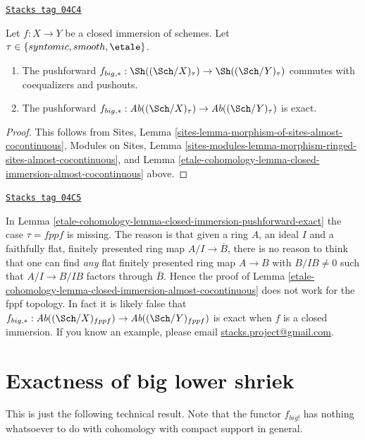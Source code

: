 \begin{lemma}
\label{etale-cohomology-lemma-closed-immersion-pushforward-exact}
\href{https://stacks.math.columbia.edu/tag/04C4}{\texttt{Stacks tag 04C4}}

Let $f : X \to Y$ be a closed immersion of schemes.
Let $\tau \in \{syntomic, smooth, \etale\}$.
\begin{enumerate}
\item The pushforward
$f_{big, *} :
\Sh((\Sch/X)_\tau)
\to
\Sh((\Sch/Y)_\tau)$
commutes with coequalizers and pushouts.
\item The pushforward
$f_{big, *} :
\textit{Ab}((\Sch/X)_\tau)
\to
\textit{Ab}((\Sch/Y)_\tau)$
is exact.
\end{enumerate}
\end{lemma}

\begin{proof}
This follows from
Sites, Lemma \ref{sites-lemma-morphism-of-sites-almost-cocontinuous},
Modules on Sites,
Lemma \ref{sites-modules-lemma-morphism-ringed-sites-almost-cocontinuous},
and
Lemma \ref{etale-cohomology-lemma-closed-immersion-almost-cocontinuous}
above.
\end{proof}

\begin{remark}
\label{etale-cohomology-remark-fppf-closed-immersion-not-closed}
\href{https://stacks.math.columbia.edu/tag/04C5}{\texttt{Stacks tag 04C5}}

In Lemma \ref{etale-cohomology-lemma-closed-immersion-pushforward-exact} the case $\tau = fppf$
is missing. The reason is that given a ring $A$, an ideal $I$ and a
faithfully flat, finitely presented ring map $A/I \to \overline{B}$, there
is no reason to think that one can find {\it any} flat finitely presented ring
map $A \to B$ with $B/IB \not = 0$ such that $A/I \to B/IB$ factors through
$\overline{B}$. Hence the proof of
Lemma \ref{etale-cohomology-lemma-closed-immersion-almost-cocontinuous}
does not work for the fppf topology.
In fact it is likely false that
$f_{big, *} : \textit{Ab}((\Sch/X)_{fppf})
\to \textit{Ab}((\Sch/Y)_{fppf})$
is exact when $f$ is a closed immersion.
If you know an example, please email
\href{mailto:stacks.project@gmail.com}{stacks.project@gmail.com}.
\end{remark}

\section{Exactness of big lower shriek}
\label{etale-cohomology-section-exactness-lower-shriek}
This is just the following technical result. Note that the functor $f_{big!}$
has nothing whatsoever to do with cohomology with compact support in
general.

